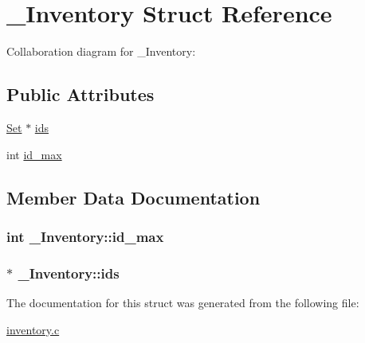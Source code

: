 \hypertarget{struct__Inventory}{}\section{\+\_\+\+Inventory Struct Reference}
\label{struct__Inventory}


Collaboration diagram for \+\_\+\+Inventory\+:
\subsection*{Public Attributes}
\begin{DoxyCompactItemize}
\item 
\hyperlink{set_8h_a6d3b7f7c92cbb4577ef3ef7ddbf93161}{Set} $\ast$ \hyperlink{struct__Inventory_a7f6b5d7d1111e7e8f8999c656ae27d0c}{ids}
\item 
int \hyperlink{struct__Inventory_a4b104bc26c8e030cae3032cbe7d940a3}{id\+\_\+max}
\end{DoxyCompactItemize}


\subsection{Member Data Documentation}
\subsubsection[{\texorpdfstring{id\+\_\+max}{id_max}}]{\setlength{\rightskip}{0pt plus 5cm}int \+\_\+\+Inventory\+::id\+\_\+max}\hypertarget{struct__Inventory_a4b104bc26c8e030cae3032cbe7d940a3}{}\label{struct__Inventory_a4b104bc26c8e030cae3032cbe7d940a3}
\subsubsection[{\texorpdfstring{ids}{ids}}]{$\ast$ \+\_\+\+Inventory\+::ids}\hypertarget{struct__Inventory_a7f6b5d7d1111e7e8f8999c656ae27d0c}{}\label{struct__Inventory_a7f6b5d7d1111e7e8f8999c656ae27d0c}


The documentation for this struct was generated from the following file\+:\begin{DoxyCompactItemize}
\item 
\hyperlink{inventory_8c}{inventory.\+c}\end{DoxyCompactItemize}
